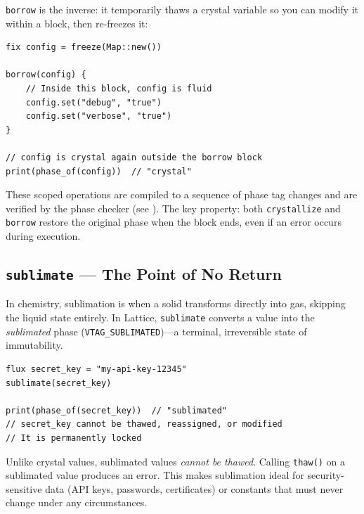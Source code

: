 \lstinline|borrow| is the inverse: it temporarily thaws a crystal variable so you can modify it within a block, then re-freezes it:

\begin{lstlisting}[language=Lattice, caption={Temporarily borrowing a crystal value}]
fix config = freeze(Map::new())

borrow(config) {
    // Inside this block, config is fluid
    config.set("debug", "true")
    config.set("verbose", "true")
}

// config is crystal again outside the borrow block
print(phase_of(config))  // "crystal"
\end{lstlisting}

These scoped operations are compiled to a sequence of phase tag changes and are verified by the phase checker (see ).
The key property: both \lstinline|crystallize| and \lstinline|borrow| restore the original phase when the block ends, even if an error occurs during execution.


\subsection{\texttt{sublimate} --- The Point of No Return}\label{subsec:sublimate}


In chemistry, sublimation is when a solid transforms directly into gas, skipping the liquid state entirely.
In Lattice, \lstinline|sublimate| converts a value into the \emph{sublimated} phase (\lstinline|VTAG_SUBLIMATED|)---a terminal, irreversible state of immutability.

\begin{lstlisting}[language=Lattice, caption={Sublimating a value}]
flux secret_key = "my-api-key-12345"
sublimate(secret_key)

print(phase_of(secret_key))  // "sublimated"
// secret_key cannot be thawed, reassigned, or modified
// It is permanently locked
\end{lstlisting}

Unlike crystal values, sublimated values \emph{cannot be thawed}.
Calling \lstinline|thaw()| on a sublimated value produces an error.
This makes sublimation ideal for security-sensitive data (API keys, passwords, certificates) or constants that must never change under any circumstances.

